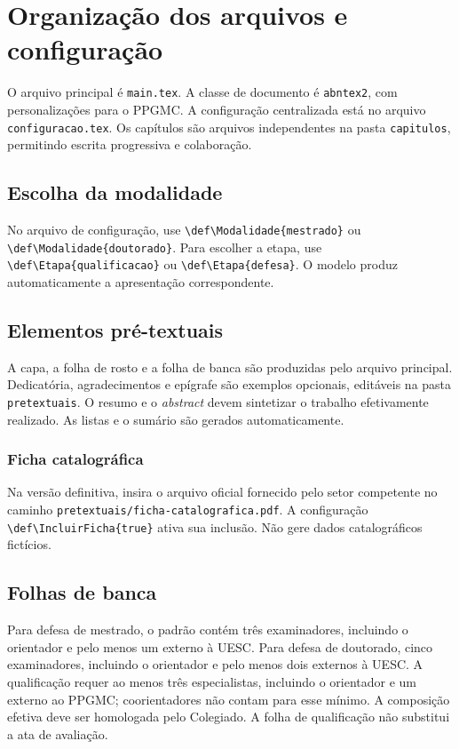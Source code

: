\chapter{Organização dos arquivos e configuração}\label{chap:organizacao}
O arquivo principal é \texttt{main.tex}. A classe de documento é \texttt{abntex2}, com personalizações para o PPGMC. A configuração centralizada está no arquivo \texttt{configuracao.tex}. Os capítulos são arquivos independentes na pasta \texttt{capitulos}, permitindo escrita progressiva e colaboração.

\section{Escolha da modalidade}
No arquivo de configuração, use \verb|\def\Modalidade{mestrado}| ou \verb|\def\Modalidade{doutorado}|. Para escolher a etapa, use \verb|\def\Etapa{qualificacao}| ou \verb|\def\Etapa{defesa}|. O modelo produz automaticamente a apresentação correspondente.

\section{Elementos pré-textuais}
A capa, a folha de rosto e a folha de banca são produzidas pelo arquivo principal. Dedicatória, agradecimentos e epígrafe são exemplos opcionais, editáveis na pasta \texttt{pretextuais}. O resumo e o \textit{abstract} devem sintetizar o trabalho efetivamente realizado. As listas e o sumário são gerados automaticamente.

\subsection{Ficha catalográfica}
Na versão definitiva, insira o arquivo oficial fornecido pelo setor competente no caminho \texttt{pretextuais/ficha-catalografica.pdf}. A configuração \verb|\def\IncluirFicha{true}| ativa sua inclusão. Não gere dados catalográficos fictícios.

\section{Folhas de banca}
Para defesa de mestrado, o padrão contém três examinadores, incluindo o orientador e pelo menos um externo à UESC. Para defesa de doutorado, cinco examinadores, incluindo o orientador e pelo menos dois externos à UESC. A qualificação requer ao menos três especialistas, incluindo o orientador e um externo ao PPGMC; coorientadores não contam para esse mínimo. A composição efetiva deve ser homologada pelo Colegiado. A folha de qualificação não substitui a ata de avaliação.

